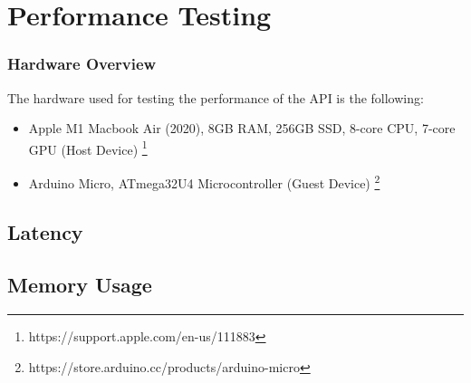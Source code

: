\section{Performance Testing}

\subsubsection{Hardware Overview}
The hardware used for testing the performance of the API is the following:

\begin{itemize}
\item Apple M1 Macbook Air (2020), 8GB RAM, 256GB SSD, 8-core CPU, 7-core GPU (Host Device) \footnote{https://support.apple.com/en-us/111883}

\item Arduino Micro, ATmega32U4 Microcontroller (Guest Device) \footnote{https://store.arduino.cc/products/arduino-micro}
\end{itemize}


\subsection{Latency}

\subsection{Memory Usage}
 